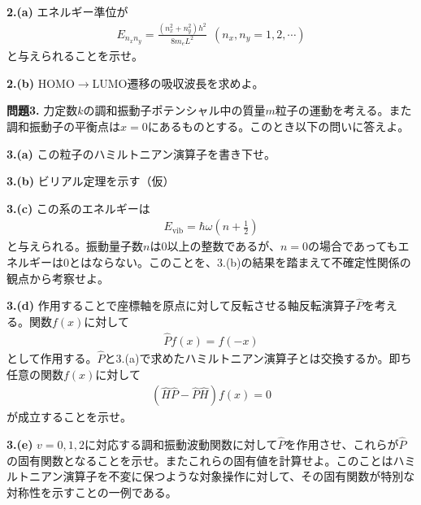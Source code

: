 \documentclass[12pt,pra,aps]{revtex4}
\begin{document}
\noindent
{\bf 2.(a)} エネルギー準位が
\begin{align}
  E_{n_x n_y} = \frac{(n_x^2+n_y^2)h^2}{8m_eL^2}\ \ (n_x,n_y=1,2,\cdots)
\end{align}
と与えられることを示せ。

\noindent
{\bf 2.(b)} HOMO$\rightarrow$LUMO遷移の吸収波長を求めよ。

\vspace{2cm}
\noindent
{\bf 問題3.} 力定数$k$の調和振動子ポテンシャル中の質量$m$粒子の運動を考える。また調和振動子の平衡点は$x=0$にあるものとする。このとき以下の問いに答えよ。

\noindent
{\bf 3.(a)} この粒子のハミルトニアン演算子を書き下せ。

\noindent
{\bf 3.(b)} ビリアル定理を示す（仮）

\noindent
{\bf 3.(c)} この系のエネルギーは
%    
\begin{align}
  E_\text{vib}=\hbar \omega\left(n+\frac{1}{2}\right)
\end{align}
%
と与えられる。振動量子数$n$は0以上の整数であるが、$n=0$の場合であってもエネルギーは0とはならない。このことを、3.(b)の結果を踏まえて不確定性関係の観点から考察せよ。

\noindent
{\bf 3.(d)} 作用することで座標軸を原点に対して反転させる軸反転演算子$\hat{P}$を考える。関数$f(x)$に対して
\begin{align}
  \hat{P}f(x)=f(-x)
\end{align}
として作用する。$\hat{P}$と3.(a)で求めたハミルトニアン演算子とは交換するか。即ち任意の関数$f(x)$に対して
\begin{align}
  (\hat{H}\hat{P}-\hat{P}\hat{H})f(x)=0
\end{align}
が成立することを示せ。

\noindent
{\bf 3.(e)} $v=0,1,2$に対応する調和振動波動関数に対して$\hat{P}$を作用させ、これらが$\hat{P}$の固有関数となることを示せ。またこれらの固有値を計算せよ。このことはハミルトニアン演算子を不変に保つような対象操作に対して、その固有関数が特別な対称性を示すことの一例である。
\end{document}
